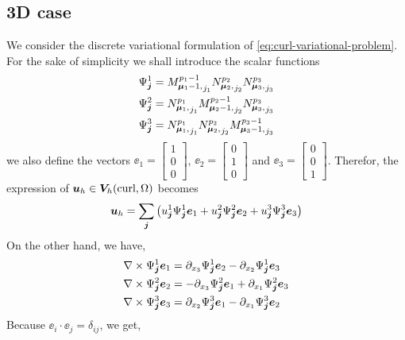 \subsection{3D case}
We consider the discrete variational formulation of \eqref{eq:curl-variational-problem}. 
For the sake of simplicity we shall introduce the scalar functions
\begin{align*}
  \Psi^1_{\bm{j}} = {M_{\boldsymbol{\mu}_1-1,}^{p_1-1}}_{j_1} {N_{\boldsymbol{\mu}_2,}^{p_2}}_{j_2} {N_{\boldsymbol{\mu}_3,}^{p_3}}_{j_3} 
  \\
  \Psi^2_{\bm{j}} = {N_{\boldsymbol{\mu}_1,}^{p_1}}_{j_1} {M_{\boldsymbol{\mu}_2-1,}^{p_2-1}}_{j_2} {N_{\boldsymbol{\mu}_3,}^{p_3}}_{j_3}  
  \\
  \Psi^3_{\bm{j}} = {N_{\boldsymbol{\mu}_1,}^{p_1}}_{j_1} {N_{\boldsymbol{\mu}_2,}^{p_2}}_{j_2} {M_{\boldsymbol{\mu}_3-1,}^{p_3-1}}_{j_3}  
\end{align*}
we also define the vectors $\ee_1 = \begin{bmatrix} 1 \\ 0 \\ 0 \end{bmatrix}$, $\ee_2 = \begin{bmatrix} 0 \\ 1 \\ 0 \end{bmatrix}$ and $\ee_3 = \begin{bmatrix} 0 \\ 0 \\ 1 \end{bmatrix}$. Therefor, the expression of $\bm{u}_h \in \bm{V}_h(\mbox{curl}, \Omega)$ becomes
\begin{align*}
  \bm{u}_h = \sum\limits_{\bm{j}} \left( 
    u_{\bm{j}}^1 \Psi^1_{\bm{j}} \bm{e}_1 
  + u_{\bm{j}}^2 \Psi^2_{\bm{j}} \bm{e}_2 
  + u_{\bm{j}}^3 \Psi^3_{\bm{j}} \bm{e}_3 
  \right)
\end{align*}
On the other hand, we have,
\begin{align*}
 \nabla \times \Psi^{1}_{\bm{j}} \bm{e}_{1} &= 
   \partial_{x_3} \Psi^{1}_{\bm{j}} \bm{e}_2 
 - \partial_{x_2} \Psi^{1}_{\bm{j}} \bm{e}_3
 \\
 \nabla \times \Psi^{2}_{\bm{j}} \bm{e}_{2} &= 
 - \partial_{x_3} \Psi^{2}_{\bm{j}} \bm{e}_1
 + \partial_{x_1} \Psi^{2}_{\bm{j}} \bm{e}_3
 \\
 \nabla \times \Psi^{3}_{\bm{j}} \bm{e}_{3} &= 
   \partial_{x_2} \Psi^{3}_{\bm{j}} \bm{e}_1 
 - \partial_{x_1} \Psi^{3}_{\bm{j}} \bm{e}_2
\end{align*}
Because $\ee_i \cdot \ee_j = \delta_{ij}$, we get, 
